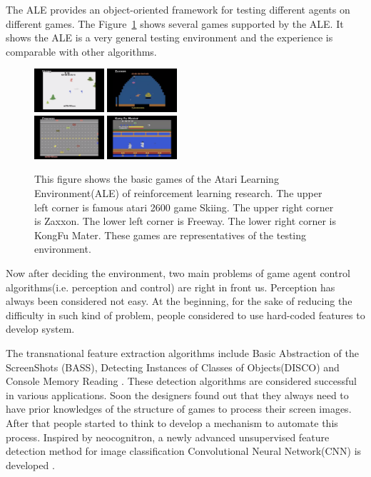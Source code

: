 \documentclass{article}
\begin{document}
The ALE provides an object-oriented framework for testing different agents on different games. The Figure~\ref{atari_game} shows several games supported by the ALE.  It shows the ALE is a very general testing environment and the experience is comparable with other algorithms.
\begin{figure}[h!]
\centering
{\includegraphics[width = 0.23\textwidth]{1}} 
{\includegraphics[width = 0.23\textwidth]{2}}\\
{\includegraphics[width = 0.23\textwidth]{3}}
{\includegraphics[width = 0.23\textwidth]{4}} 
\caption{This figure shows the basic games of the Atari Learning Environment(ALE) of reinforcement learning research. The upper left corner is famous atari 2600 game Skiing. The upper right corner is Zaxxon. The lower left corner is Freeway. The lower right corner is KongFu Mater. These games are representatives of the testing environment.}\label{atari_game}
\end{figure}

Now after deciding the environment, two main problems of game agent control algorithms(i.e. perception and control) are right in front us. Perception has always been considered not easy. At the beginning, for the sake of reducing the difficulty in such kind of problem, people considered to use hard-coded features to develop system.  

The transnational feature extraction algorithms include Basic Abstraction of the ScreenShots (BASS), 	Detecting Instances of Classes of Objects(DISCO) and Console Memory Reading \citep{naddaf2010game}. These detection algorithms are considered successful in various applications. Soon the designers found out that they always need to have prior knowledges of the structure of games to process their screen images. After that people started to think to develop a mechanism to automate this process. Inspired by neocognitron\citep{fukushima1980neocognitron}, a newly advanced unsupervised feature detection method for image classification Convolutional Neural Network(CNN) is developed .
\end{document}
